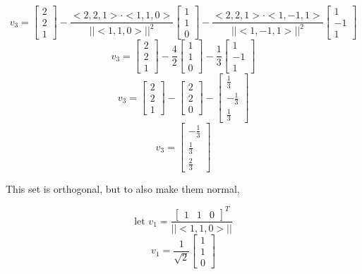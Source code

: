 \documentclass{article}
\begin{document}
\[ v_3 = \begin{bmatrix} 2 \\ 2 \\ 1 \end{bmatrix} - \frac{<2, 2, 1> \cdot <1, 1, 0>} {||<1, 1, 0>||^2} \begin{bmatrix} 1 \\ 1 \\ 0 \end{bmatrix} - \frac{<2, 2, 1> \cdot <1, -1, 1>}{||<1, -1, 1>||^2} \begin{bmatrix} 1 \\ -1 \\ 1 \end{bmatrix} \]
\[ v_3 = \begin{bmatrix} 2 \\ 2 \\ 1 \end{bmatrix} - \frac{4}{2} \begin{bmatrix} 1 \\ 1 \\ 0 \end{bmatrix} - \frac{1}{3} \begin{bmatrix} 1 \\ -1 \\ 1 \end{bmatrix} \]
\[ v_3 = \begin{bmatrix} 2 \\ 2 \\ 1 \end{bmatrix} - \begin{bmatrix} 2 \\ 2 \\ 0 \end{bmatrix} - \begin{bmatrix} \frac{1}{3} \\ -\frac{1}{3} \\ \frac{1}{3} \end{bmatrix} \]
\[ v_3 = \begin{bmatrix} -\frac{1}{3} \\ \frac{1}{3} \\ \frac{2}{3} \end{bmatrix} \]

This set is orthogonal, but to also make them normal,

\[ \text{let } v_1 = \frac{\begin{bmatrix} 1 & 1 & 0 \end{bmatrix}^T}{||<1, 1, 0>||} \]
\[ v_1 = \frac{1}{\sqrt{2}} \begin{bmatrix} 1 \\ 1 \\ 0 \end{bmatrix} \]
\end{document}
